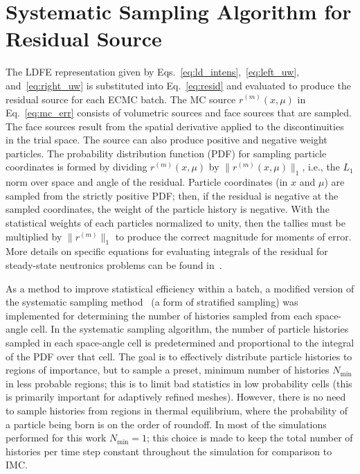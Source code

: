 \section{Systematic Sampling Algorithm for Residual Source}
\label{sec:systematic_sampling}

The LDFE representation given by Eqs.~\eqref{eq:ld_intens},~\eqref{eq:left_uw},
and~\eqref{eq:right_uw} is substituted into Eq.~\eqref{eq:resid} and evaluated
to produce the residual source for each ECMC batch.  The MC source
$r^{(m)}(x,\mu)$ in Eq.~\eqref{eq:mc_err} consists of volumetric sources and
face sources that are sampled.  The face sources result from the spatial derivative applied to
the discontinuities in the trial space.  The source can also produce positive and
negative weight particles.  The probability distribution function (PDF) for
sampling particle coordinates is formed by dividing $r^{(m)}(x,\mu)$ by $\|r^{(m)}(x,\mu)\|_1$,
i.e., the $L_1$ norm over space and angle of the residual.  Particle coordinates (in $x$ and $\mu$)
are sampled from the strictly positive PDF; then, if the residual is negative at the sampled coordinates, the weight of the
particle history is negative. With
the statistical weights of each particles normalized to unity, then the tallies must be multiplied
by $\|r^{(m)}\|_1$ to produce the correct magnitude for moments of error.
  More details on specific equations for evaluating integrals of the
residual for steady-state neutronics problems can be found in~\cite{jake}.  
 
As a method to improve statistical efficiency within a batch, a modified version of the systematic
sampling method~\cite{shultis_mc} (a form of stratified sampling) was implemented for determining the number of
histories sampled from each space-angle cell.  In the systematic sampling algorithm, the
number of particle histories sampled in each space-angle cell is predetermined and
proportional to the integral of the
PDF over that cell.  The goal is to effectively distribute particle histories to regions of
importance, but to sample a preset, minimum number of histories $N_{\min}$ in less probable
regions; this is to limit bad statistics in low probability cells (this is primarily important for adaptively
refined meshes).  However, there is no need to sample histories
from regions in thermal equilibrium, where the probability of a particle being born is on
the order of roundoff.  In most of the simulations performed for this work
$N_{\min}=1$; this choice is made to keep the total number of histories per time
step constant throughout the simulation for comparison to IMC.  

